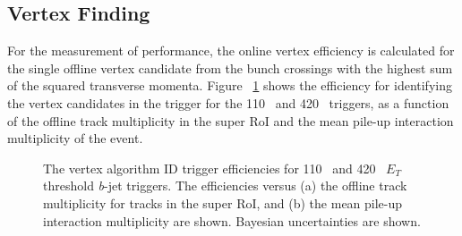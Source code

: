 		\subsection*{Vertex Finding}
		For the measurement of performance, the online vertex efficiency is calculated for the single offline vertex candidate from the bunch crossings with the highest sum of the squared transverse momenta. 
		Figure ~\ref{fig:vertex_idtrig_eff} shows the efficiency for identifying the vertex candidates in the trigger for the 110 \gev\ and 420 \gev\ triggers, as a function of the offline track multiplicity in the super \ac{RoI} and the mean pile-up interaction multiplicity of the event.
\begin{figure}[!htb]
	\begin{center}
		\hspace{0.03\textwidth}
			\hspace{0.03\textwidth}
	\end{center}	
	\caption{The vertex algorithm \ac{ID} trigger efficiencies for 110 \gev\ and 420 \gev\ $E_T$ threshold \textit{b}-jet triggers. The efficiencies versus (a) the offline track multiplicity for tracks in the super \ac{RoI}, and (b) the mean pile-up interaction multiplicity are shown. Bayesian uncertainties are shown.}
	\label{fig:vertex_idtrig_eff}
	\end{figure}	
		

